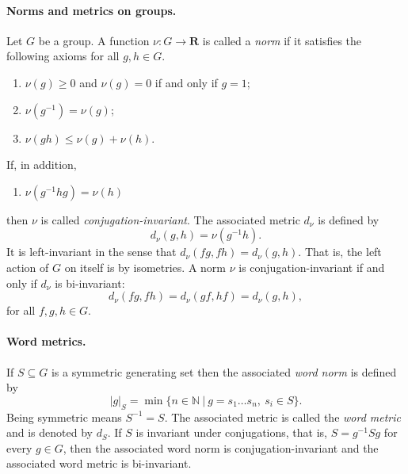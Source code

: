 \documentclass[12pt,reqno,a4paper]{article}
\theoremstyle{definition}
\theoremstyle{remark}
\numberwithin{equation}{section}
\numberwithin{figure}{section}
\newcommand{\B}[1]{{\mathbf #1}}
\begin{document}
\paragraph{Norms and metrics on groups.}\label{PA:metrics}
Let $G$ be a group. A function $\nu\colon G\to \B R$ is called a {\em norm} if
it satisfies the following axioms for all $g,h\in G$.
\begin{enumerate}
\item $\nu(g)\geq 0$ and $\nu(g)=0$ if and only if $g=1$;
\item $\nu(g^{-1}) = \nu(g)$;
\item $\nu(gh) \leq \nu(g)+\nu(h)$.
\end{enumerate}
If, in addition, 
\begin{enumerate}
\item[4.]
$\nu(g^{-1}hg) = \nu(h)$
\end{enumerate}
then $\nu$ is called {\em conjugation-invariant}.
The associated metric $d_{\nu}$ is defined by
$$
d_{\nu}(g,h) = \nu(g^{-1}h).
$$
It is left-invariant in the sense that $d_{\nu}(fg,fh) = d_{\nu}(g,h)$. That is, the
left action of $G$ on itself is by isometries. A norm $\nu$ is conjugation-invariant
if and only if $d_{\nu}$ is bi-invariant:
$$
d_{\nu}(fg,fh) = d_{\nu}(gf,hf) = d_{\nu}(g,h),
$$
for all $f,g,h\in G$.

\paragraph{Word metrics.}\label{PA:word}
If $S\subseteq G$ is a symmetric generating set then the associated
{\em word norm} is defined by
$$
|g|_S = \min\{n\in \mathbb N\ |\ g=s_1\dots s_n,\ s_i\in S\}.
$$
Being symmetric means $S^{-1}=S$.
The associated metric is called the {\em word metric} and is denoted by $d_S$.
If $S$ is invariant under conjugations, that is, $S=g^{-1}Sg$ for every $g\in G$,
then the associated word norm is conjugation-invariant and the associated
word metric is bi-invariant.
\end{document}
